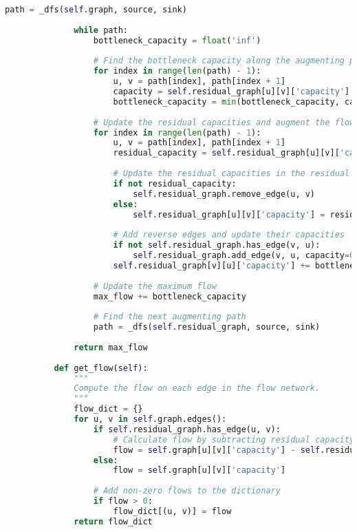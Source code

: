\documentclass[a4paper]{exam}
\begin{document}
\begin{questions}
\begin{solution}
\begin{lstlisting}[language=Python, caption={Python code for MaxFlow class with Ford-Fulkerson algorithm.}, label={lst:maxflow}]
              path = _dfs(self.graph, source, sink)
      
              while path:
                  bottleneck_capacity = float('inf')
      
                  # Find the bottleneck capacity along the augmenting path
                  for index in range(len(path) - 1):
                      u, v = path[index], path[index + 1]
                      capacity = self.residual_graph[u][v]['capacity']
                      bottleneck_capacity = min(bottleneck_capacity, capacity)
      
                  # Update the residual capacities and augment the flow along the path
                  for index in range(len(path) - 1):
                      u, v = path[index], path[index + 1]
                      residual_capacity = self.residual_graph[u][v]['capacity'] - bottleneck_capacity
      
                      # Update the residual capacities in the residual graph
                      if not residual_capacity:
                          self.residual_graph.remove_edge(u, v)
                      else:
                          self.residual_graph[u][v]['capacity'] = residual_capacity
      
                      # Add reverse edges and update their capacities
                      if not self.residual_graph.has_edge(v, u):
                          self.residual_graph.add_edge(v, u, capacity=0)
                      self.residual_graph[v][u]['capacity'] += bottleneck_capacity
      
                  # Update the maximum flow
                  max_flow += bottleneck_capacity
      
                  # Find the next augmenting path
                  path = _dfs(self.residual_graph, source, sink)
      
              return max_flow
      
          def get_flow(self):
              """
              Compute the flow on each edge in the flow network.
              """
              flow_dict = {}
              for u, v in self.graph.edges():
                  if self.residual_graph.has_edge(u, v):
                      # Calculate flow by subtracting residual capacity from original capacity
                      flow = self.graph[u][v]['capacity'] - self.residual_graph[u][v]['capacity']
                  else:
                      flow = self.graph[u][v]['capacity']
      
                  # Add non-zero flows to the dictionary
                  if flow > 0:
                      flow_dict[(u, v)] = flow
              return flow_dict
      \end{lstlisting}
      
  \end{solution}
\end{questions}
\end{document}
